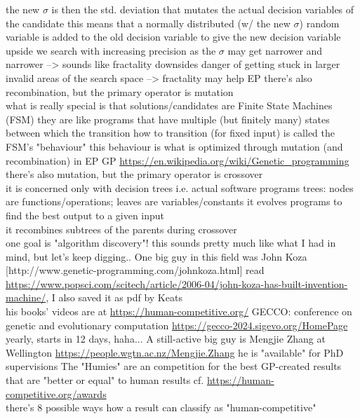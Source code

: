 \documentclass{article}\usepackage[margin=2cm]{geometry}
\begin{document}
\begin{cascade}
    \stepout
    the new $\sigma$ is then the std. deviation that mutates the actual decision variables of the candidate
    \stepin
    this means that a normally distributed (w/ the new $\sigma$) random variable is added to the old decision variable to give the new decision variable
    \stepout
    \stepout
    upside
    \stepin
    we search with increasing precision as the $\sigma$ may get narrower and narrower
    \stepin
    --> sounds like fractality
    \stepout
    \stepout
    downsides
    \stepin
    danger of getting stuck in larger invalid areas of the search space
    \stepin
    --> fractality may help
    \stepout
    \stepout
    \stepout
    EP
    \stepin
    there's also recombination, but the primary operator is mutation\\
    what is really special is that solutions/candidates are Finite State Machines (FSM)
    \stepin
    they are like programs that have multiple (but finitely many) states between which the transition
    \stepin
    how to transition (for fixed input) is called the FSM's "behaviour"
    \stepin
    this behaviour is what is optimized through mutation (and recombination) in EP
    \stepout
    \stepout
    \stepout
    \stepout
    GP \url{https://en.wikipedia.org/wiki/Genetic_programming}
    \stepin
    there's also mutation, but the primary operator is crossover\\
    it is concerned only with decision trees i.e. actual software programs
    \stepin
    trees: nodes are functions/operations; leaves are variables/constants
    \stepout
    it evolves programs to find the best output to a given input\\
    it recombines subtrees of the parents during crossover\\
    one goal is "algorithm discovery"!
    \stepin
    this sounds pretty much like what I had in mind, but let's keep digging..
    \stepout
    One big guy in this field was John Koza [http://www.genetic-programming.com/johnkoza.html]
    \stepin
    read \url{https://www.popsci.com/scitech/article/2006-04/john-koza-has-built-invention-machine/}, I also saved it as pdf by Keats\\
    his books' videos are at \url{https://human-competitive.org/}
    \stepout
    GECCO: conference on genetic and evolutionary computation \url{https://gecco-2024.sigevo.org/HomePage}
    \stepin
    yearly, starts in 12 days, haha...
    \stepout
    A still-active big guy is Mengjie Zhang at Wellington \url{https://people.wgtn.ac.nz/Mengjie.Zhang}
    \stepin
    he is "available" for PhD supervisions
    \stepout
    The "Humies" are an competition for the best GP-created results that are "better or equal" to human results
    \stepin
    cf. \url{https://human-competitive.org/awards}\\
    there's 8 possible ways how a result can classify as "human-competitive"
\end{cascade}
\end{document}
